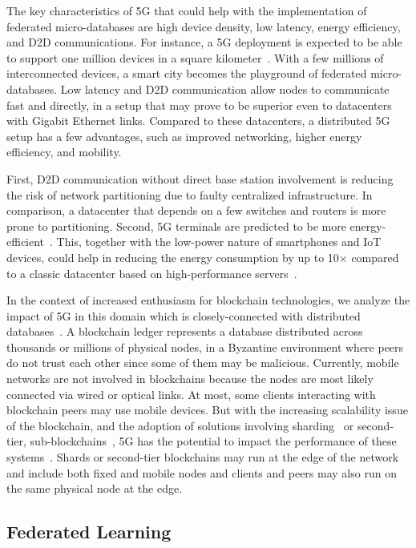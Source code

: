 \documentclass[11pt]{article}
\begin{document}
The key characteristics of 5G that could help with the implementation of
federated micro-databases are high device density, low latency, energy
efficiency, and D2D communications. For instance, a 5G deployment is expected to
be able to support one million devices in a square kilometer~\cite{5g_ch_opp}.
With a few millions of interconnected devices, a smart city becomes the
playground of federated micro-databases. Low latency and D2D communication allow
nodes to communicate fast and directly, in a setup that may prove to be superior
even to datacenters with Gigabit Ethernet links. Compared to these datacenters,
a distributed 5G setup has a few advantages, such as improved networking, higher
energy efficiency, and mobility.

First, D2D communication without direct base station involvement is reducing the
risk of network partitioning due to faulty centralized infrastructure. In
comparison, a datacenter that depends on a few switches and routers is more
prone to partitioning. Second, 5G terminals are predicted to be more
energy-efficient~\cite{5g_ch_opp}. This, together with the low-power nature of
smartphones and IoT devices, could help in reducing the energy consumption by up
to 10$\times$ compared to a classic datacenter based on high-performance
servers~\cite{5g_our_article}.

In the context of increased enthusiasm for blockchain technologies, we analyze
the impact of 5G in this domain which is closely-connected with distributed
databases~\cite{anh_blockchain_tkde}. A blockchain ledger represents a database
distributed across thousands or millions of physical nodes, in a Byzantine
environment where peers do not trust each other since some of them may be
malicious. Currently, mobile networks are not involved in blockchains because
the nodes are most likely connected via wired or optical links. At most, some
clients interacting with blockchain peers may use mobile devices. But with the
increasing scalability issue of the blockchain, and the adoption of solutions
involving sharding~\cite{hung_sharding} or second-tier,
sub-blockchains~\cite{lightning_bitcoin}, 5G has the potential to impact the
performance of these systems~\cite{5g_our_article}.
Shards or second-tier blockchains may run at the edge of the network and include
both fixed and mobile nodes and clients and peers may also run on the same
physical node at the edge.

\vspace{-2mm}
\subsection{Federated Learning}
\vspace{-1mm}
\end{document}
